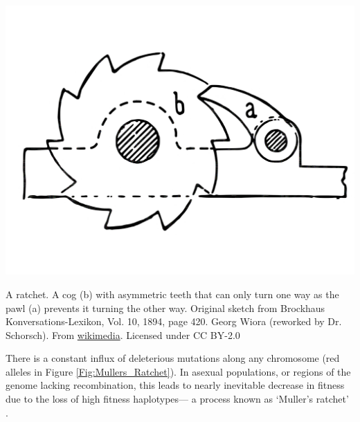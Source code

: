 \begin{marginfigure}[0cm]
\begin{center}
  \includegraphics[width = 0.75 \textwidth]{illustration_images/multiple_sel_loci/ratchet/1200px-Sperrklinke_Schema.pdf}
\end{center}
\caption{A ratchet. A cog (b)  with asymmetric teeth that can only turn one way as the pawl (a) prevents it turning the other way. \newline \noindent \tiny{Original sketch from Brockhaus Konversations-Lexikon, Vol. 10, 1894, page 420. Georg Wiora (reworked by Dr. Schorsch). From \href{https://commons.wikimedia.org/wiki/File:Sperrklinke\_Schema.jp2}{wikimedia}. Licensed under CC
    BY-2.0 } } \label{Fig:Ratchet}  
\end{marginfigure}
There is a constant influx of deleterious mutations along any chromosome (red alleles in Figure \ref{Fig:Mullers_Ratchet}). In asexual populations, or regions of the genome lacking recombination, this leads to nearly inevitable decrease in fitness due to the loss of high fitness haplotypes--- a process known as `Muller's ratchet' \citep{muller1964relation}.

